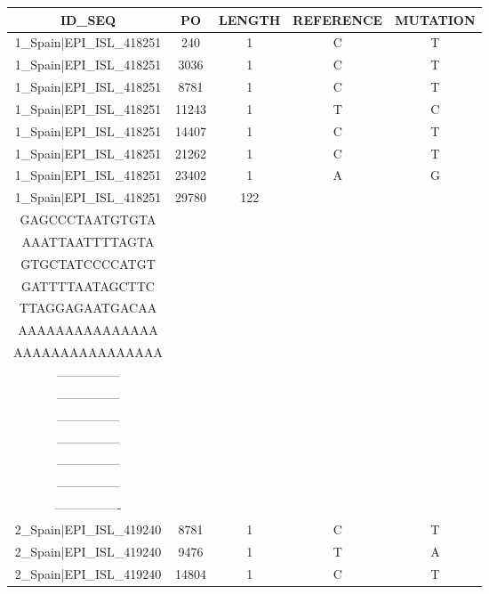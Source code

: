 \documentclass[a4paper,10pt]{article}
\begin{document}
\begin{longtable}{@{}ccccc@{}}
\toprule
\textbf{ID\_SEQ} & \textbf{PO} & \textbf{LENGTH} & \textbf{REFERENCE} & \textbf{MUTATION} \\* \midrule
\endfirsthead
%
\cline{1-5}
\endhead
%
1\_Spain|EPI\_ISL\_418251 & 240 & 1 & C & T \\* \midrule
1\_Spain|EPI\_ISL\_418251 & 3036 & 1 & C & T \\* \midrule
1\_Spain|EPI\_ISL\_418251 & 8781 & 1 & C & T \\* \midrule
1\_Spain|EPI\_ISL\_418251 & 11243 & 1 & T & C \\* \midrule
1\_Spain|EPI\_ISL\_418251 & 14407 & 1 & C & T \\* \midrule
1\_Spain|EPI\_ISL\_418251 & 21262 & 1 & C & T \\* \midrule
1\_Spain|EPI\_ISL\_418251 & 23402 & 1 & A & G \\* \midrule
1\_Spain|EPI\_ISL\_418251 & 29780 & 122 & \begin{tabular}[c]{@{}c@{}}AGCTGCCTATATGGAA\\ GAGCCCTAATGTGTA\\ AAATTAATTTTAGTA\\ GTGCTATCCCCATGT\\ GATTTTAATAGCTTC\\ TTAGGAGAATGACAA\\ AAAAAAAAAAAAAAA\\ AAAAAAAAAAAAAAAA\end{tabular} & \begin{tabular}[c]{@{}c@{}}----------------\\ ---------------\\ ---------------\\ ---------------\\ ---------------\\ ---------------\\ ---------------\\ ----------------\end{tabular} \\* \midrule
2\_Spain|EPI\_ISL\_419240 & 8781 & 1 & C & T \\* \midrule
2\_Spain|EPI\_ISL\_419240 & 9476 & 1 & T & A \\* \midrule
2\_Spain|EPI\_ISL\_419240 & 14804 & 1 & C & T \\* \midrule

\end{longtable}
\end{document}
